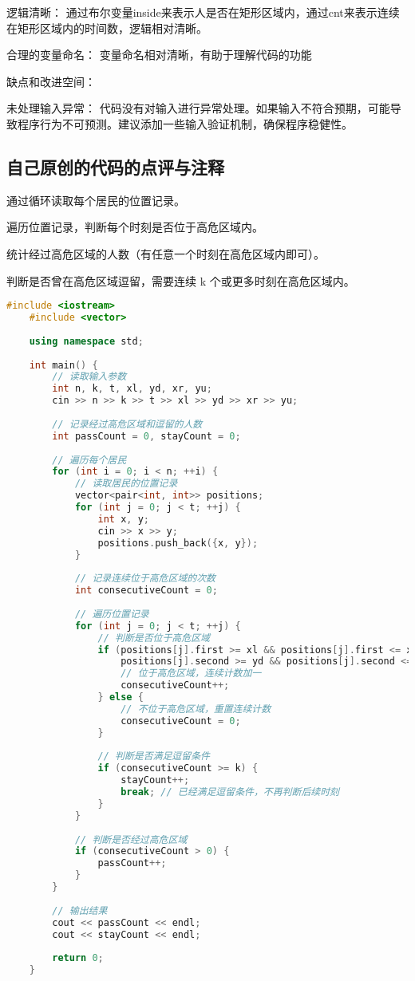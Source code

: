 逻辑清晰： 通过布尔变量inside来表示人是否在矩形区域内，通过cnt来表示连续在矩形区域内的时间数，逻辑相对清晰。

合理的变量命名： 变量命名相对清晰，有助于理解代码的功能

缺点和改进空间：

未处理输入异常： 代码没有对输入进行异常处理。如果输入不符合预期，可能导致程序行为不可预测。建议添加一些输入验证机制，确保程序稳健性。

\subsection{自己原创的代码的点评与注释}

通过循环读取每个居民的位置记录。

遍历位置记录，判断每个时刻是否位于高危区域内。

统计经过高危区域的人数（有任意一个时刻在高危区域内即可）。

判断是否曾在高危区域逗留，需要连续 k 个或更多时刻在高危区域内。

\begin{lstlisting}[language=C++]
    #include <iostream>
    #include <vector>
    
    using namespace std;
    
    int main() {
        // 读取输入参数
        int n, k, t, xl, yd, xr, yu;
        cin >> n >> k >> t >> xl >> yd >> xr >> yu;
    
        // 记录经过高危区域和逗留的人数
        int passCount = 0, stayCount = 0;
    
        // 遍历每个居民
        for (int i = 0; i < n; ++i) {
            // 读取居民的位置记录
            vector<pair<int, int>> positions;
            for (int j = 0; j < t; ++j) {
                int x, y;
                cin >> x >> y;
                positions.push_back({x, y});
            }
    
            // 记录连续位于高危区域的次数
            int consecutiveCount = 0;
    
            // 遍历位置记录
            for (int j = 0; j < t; ++j) {
                // 判断是否位于高危区域
                if (positions[j].first >= xl && positions[j].first <= xr &&
                    positions[j].second >= yd && positions[j].second <= yu) {
                    // 位于高危区域，连续计数加一
                    consecutiveCount++;
                } else {
                    // 不位于高危区域，重置连续计数
                    consecutiveCount = 0;
                }
    
                // 判断是否满足逗留条件
                if (consecutiveCount >= k) {
                    stayCount++;
                    break; // 已经满足逗留条件，不再判断后续时刻
                }
            }
    
            // 判断是否经过高危区域
            if (consecutiveCount > 0) {
                passCount++;
            }
        }
    
        // 输出结果
        cout << passCount << endl;
        cout << stayCount << endl;
    
        return 0;
    }
\end{lstlisting}